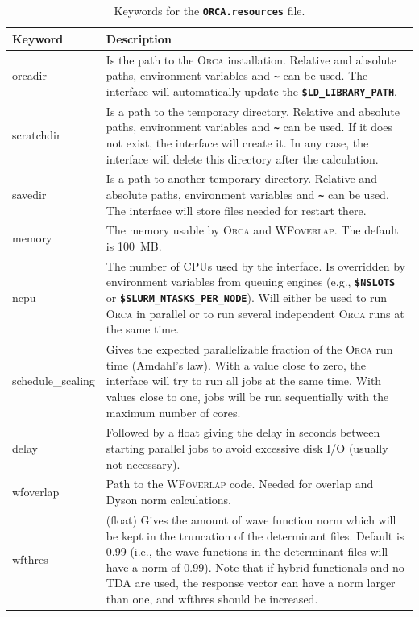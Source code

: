 \documentclass[a4paper,10pt,DIV=15,openany]{scrbook}
\newcommand{\ttt}[1]{\textbf{\texttt{#1}}}
\begin{document}
\begin{table}
  \centering
  \caption{Keywords for the \ttt{ORCA.resources} file.}
  \label{tab:orca_sh2}
  \begin{tabular}{>{\ttfamily}lp{12cm}}
  \hline
  Keyword       &Description\\
  \hline
orcadir                 &Is the path to the \textsc{Orca} installation. Relative and absolute paths, environment variables and \ttt{\textasciitilde} can be used. The interface will automatically update the \ttt{\$LD\_LIBRARY\_PATH}. 
\\
scratchdir              &Is a path to the temporary directory. Relative and absolute paths, environment variables and \ttt{\textasciitilde} can be used. If it does not exist, the interface will create it. In any case, the interface will delete this directory after the calculation. 
\\
savedir                 &Is a path to another temporary directory.  Relative and absolute paths, environment variables and \ttt{\textasciitilde} can be used. The interface will store files needed for restart there.
\\
memory                  &The memory usable by \textsc{Orca} and \textsc{WFoverlap}. The default is 100~MB. 
\\
ncpu                    &The number of CPUs used by the interface. Is overridden by environment variables from queuing engines (e.g., \ttt{\$NSLOTS} or \ttt{\$SLURM\_NTASKS\_PER\_NODE}). Will either be used to run \textsc{Orca} in parallel or to run several independent \textsc{Orca} runs at the same time.
\\
schedule\_scaling       &Gives the expected parallelizable fraction of the \textsc{Orca} run time (Amdahl's law). With a value close to zero, the interface will try to run all jobs at the same time. With values close to one, jobs will be run sequentially with the maximum number of cores.
\\
delay                   &Followed by a float giving the delay in seconds between starting parallel jobs to avoid excessive disk I/O (usually not necessary).
\\
wfoverlap               &Path to the \textsc{WFoverlap} code. Needed for overlap and Dyson norm calculations.
\\
wfthres                 &(float) Gives the amount of wave function norm which will be kept in the truncation of the determinant files. Default is 0.99 (i.e., the wave functions in the determinant files will have a norm of 0.99). Note that if hybrid functionals and no TDA are used, the response vector can have a norm larger than one, and wfthres should be increased.

\end{tabular}
\end{table}
\end{document}
